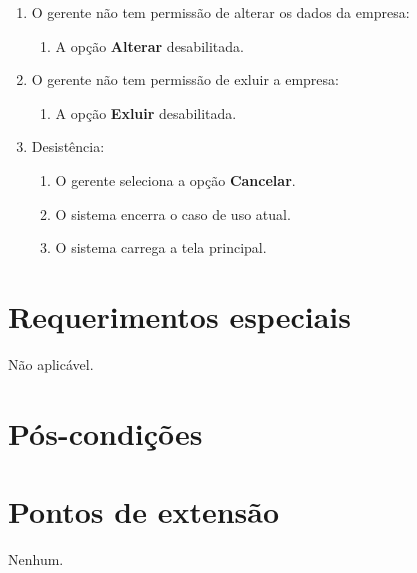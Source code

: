 \begin{enumerate}
	\item O gerente não tem permissão de alterar os dados da empresa:
	\begin{enumerate}
		\item A opção \textbf{Alterar} desabilitada.
	\end{enumerate}
	\item O gerente não tem permissão de exluir a empresa:
	\begin{enumerate}
		\item A opção \textbf{Exluir} desabilitada.
	\end{enumerate}	
	\item Desistência:
	\begin{enumerate}
		\item O gerente seleciona a opção \textbf{Cancelar}.
		\item O sistema encerra o caso de uso atual.
		\item O sistema carrega a tela principal.
	\end{enumerate}
\end{enumerate}

\section{Requerimentos especiais}

Não aplicável.

\section{Pós-condições}

\section{Pontos de extensão}

Nenhum.